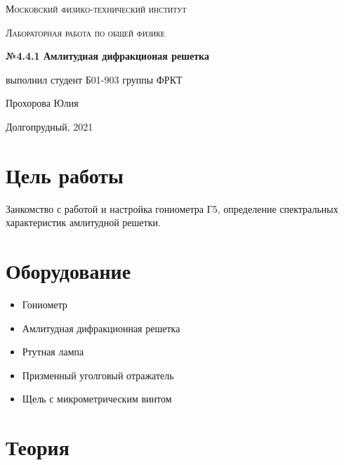 \documentclass[a4paper]{article}
\begin{document}
\graphicspath{ {pictures/} }

\begin{titlepage}
	\centering
	\vspace{5cm}
    {\scshape\LARGE Московский физико-технический институт\par}
	\vspace{5cm}
	{\scshape\Large Лабораторная работа по общей физике \par}
	\vspace{1cm}
    {\huge\bfseries  №4.4.1 Амлитудная дифракционая решетка   \par}
	\vspace{1cm}
	\vfill
    \begin{flushright}
        {\large выполнил студент Б01-903 группы ФРКТ}\par
        \vspace{0.3cm}
        {\LARGE Прохорова Юлия}
    \end{flushright}
	\vfill
Долгопрудный, 2021
\end{titlepage}

\pagestyle{fancy} 
\fancyfoot[C]{ \noindent\rule{\textwidth}{0.4pt} \thepage }

\tableofcontents

\newpage



\section{Цель работы}

Занкомство с работой и настройка гониометра Г5, определение спектральных характеристик амлитудной решетки.

\section{Оборудование}

\begin{itemize}
    \item Гониометр 
    \item Амлитудная дифракционная решетка 
    \item Ртутная лампа 
    \item Призменный уголговый отражатель
    \item Щель с микрометрическим винтом
\end{itemize}

\section{Теория}
\end{document}
